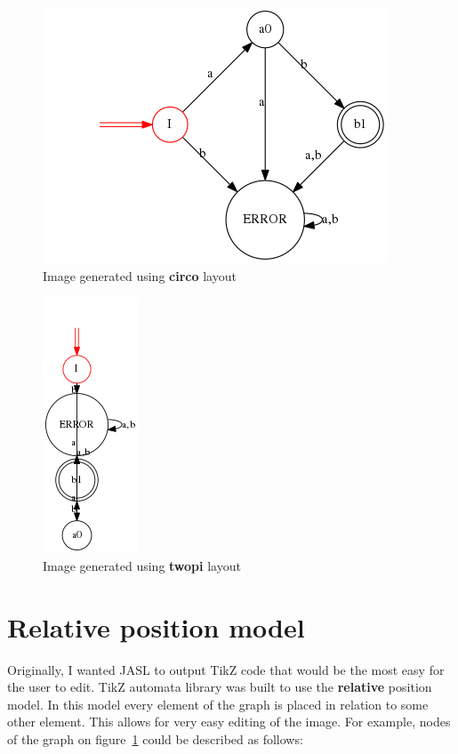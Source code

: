 \documentclass{ctuthesis}
\begin{document}
\begin{figure}[H]
\includegraphics[width=0.7\linewidth]{figures/layouts_circo.png}
\caption{Image generated using \textbf{circo} layout}
\label{fig:layout_diff_circo}
\end{figure}

\begin{figure}[H]
\includegraphics[width=0.2\linewidth]{figures/layouts_twopi.png}
\caption{Image generated using \textbf{twopi} layout}
\label{fig:layout_diff_twopi}
\end{figure}

\section{Relative position model}
Originally, I wanted JASL to output TikZ code that would be the most easy for the user to edit. TikZ automata library was built to use the \textbf{relative} position model. In this model every element of the graph is placed in relation to some other element. This allows for very easy editing of the image. For example, nodes of the graph on figure~\ref{fig:layout_diff_circo} could be described as follows:
\end{document}
